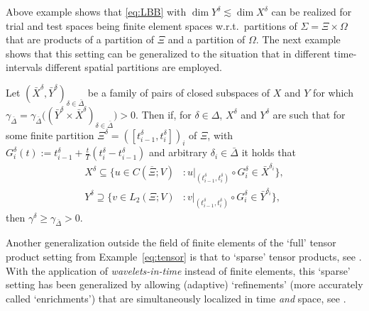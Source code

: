 \documentclass{amsart}
\numberwithin{equation}{section}
\newcommand{\1}{\mathbb 1}
\begin{document}
Above example shows that \eqref{eq:LBB} with $\dim Y^\delta \lesssim \dim X^\delta$ can be realized for trial and test spaces being finite element spaces w.r.t.~partitions of $\Sigma=\Xi \times \Omega$ that are products of a partition of $\Xi$ and a partition of $\Omega$. The next example shows that this setting can be generalized to the situation that in different time-intervals different spatial partitions are employed.



\begin{example}
Let $(\bar{X}^\delta, \bar{Y}^\delta)_{\delta \in \bar{\Delta}}$ be a family of pairs of closed subspaces of $X$ and $Y$
for which $\gamma_{\bar{\Delta}}=\gamma_{\bar{\Delta}} \big((\bar{Y}^\delta \times \bar{X}^\delta)_{\delta \in \bar{\Delta}}\big)>0$.
Then if, for $\delta \in \Delta$, $X^\delta$ and $Y^\delta$ are such that for some
finite partition $\Xi^\delta=([t_{i-1}^\delta,t_{i}^\delta])_i$ of $\Xi$, with
$G^\delta_i(t):=t_{i-1}^\delta+\frac{t}{T}(t_{i}^\delta-t_{i-1}^\delta)$ and arbitrary $\delta_i \in \bar{\Delta}$ it holds that
\begin{align*}
X^\delta \subseteq \{u \in C(\overline{\Xi};V) &\colon u|_{(t^\delta_{i-1},t^\delta_i)} \circ G^\delta_i \in \bar{X}^{\delta_i}\},\\
Y^\delta \supseteq \{v \in L_2(\Xi;V) &\colon v|_{(t^\delta_{i-1},t^\delta_i)} \circ G^\delta_i \in \bar{Y}^{\delta_i}\},
\end{align*}
then $\gamma^\delta \geq \gamma_{\bar{\Delta}}>0$. 
\end{example}


\begin{remark} Another generalization outside the field of finite elements of the `full' tensor product setting from Example~\ref{eq:tensor} is that to `sparse' tensor products, see \cite{11}.
With the application of \emph{wavelets-in-time} instead of finite elements, this `sparse' setting has been generalized by allowing (adaptive)  `refinements' (more accurately called `enrichments') that are simultaneously localized in time \emph{and} space, see \cite{249.991}. 
\end{remark}





\end{document}
